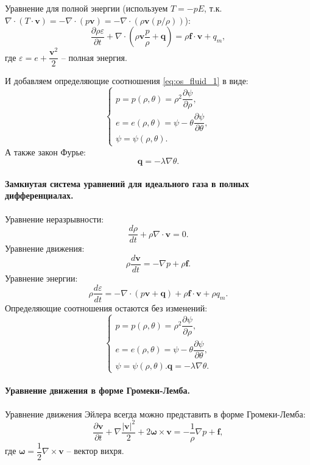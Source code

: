 Уравнение для полной энергии (используем $T = -p E$, т.к. $\nabla \cdot (T \cdot\mathbf{v}) = - \nabla \cdot (p \mathbf{v}) = - \nabla \cdot (\rho \mathbf{v} (p / \rho)) $):
\[
  \dfrac{\partial \rho \varepsilon}{\partial t} + \nabla \cdot \left( \rho \mathbf{v} \dfrac{p}{\rho} + \mathbf{q} \right) = \rho \mathbf{f} \cdot \mathbf{v} + q_m,
\]
где $\varepsilon = e + \dfrac{\mathbf{v}^2}{2}$ -- полная энергия.

И добавляем определяющие соотношения \eqref{eq:os_fluid_1} в виде:
\[
  \begin{cases}
    p = p(\rho, \theta) = \rho^2 \dfrac{\partial \psi}{\partial \rho}, \\
    e = e(\rho, \theta) = \psi - \theta \dfrac{\partial \psi}{\partial \theta}, \\
    \psi = \psi(\rho, \theta).
  \end{cases}
\]
А также закон Фурье:
\[
  \mathbf{q} = - \lambda \nabla \theta.
\]

\paragraph{Замкнутая система уравнений для идеального газа в полных дифференциалах.}

Уравнение неразрывности:
\[
  \dfrac{d \rho}{dt} + \rho \nabla \cdot \mathbf{v} = 0.
\]
Уравнение движения:
\[
  \rho \dfrac{d \mathbf{v}}{dt} = - \nabla p + \rho \mathbf{f}.
\]
Уравнение энергии:
\[
  \rho \dfrac{d\varepsilon}{dt} = - \nabla \cdot \left( p \mathbf{v} + \mathbf{q} \right) + \rho \mathbf{f} \cdot \mathbf{v} + \rho q_m.
\]
Определяющие соотношения остаются без изменений:
\[
  \begin{cases}
    p = p(\rho, \theta) = \rho^2 \dfrac{\partial \psi}{\partial \rho}, \\
    e = e(\rho, \theta) = \psi - \theta \dfrac{\partial \psi}{\partial \theta}, \\
    \psi = \psi(\rho, \theta).
    \mathbf{q} = - \lambda \nabla \theta.
  \end{cases}    
\]

\paragraph{Уравнение движения в форме Громеки-Лемба.}

\begin{theorem}
  Уравнение движения Эйлера всегда можно представить в форме Громеки-Лемба:
  \[
    \dfrac{\partial \mathbf{v}}{\partial t} + \nabla \dfrac{|\mathbf{v}|^2}{2} + 2 \mathbf{\omega} \times \mathbf{v} = - \dfrac{1}{\rho} \nabla p + \mathbf{f},
  \]
  где $\mathbf{\omega} = \dfrac{1}{2} \nabla \times \mathbf{v}$ -- вектор вихря.
\end{theorem}
